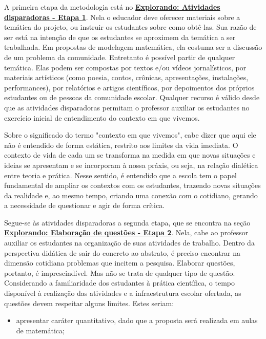 \begin{apresentacao}

A primeira etapa da metodologia está no \hyperref[etapa1]{\textcolor{session1}{\textbf{Explorando: Atividades disparadoras - Etapa 1}}}. Nela o educador deve oferecer materiais sobre a temática do projeto, ou instruir os estudantes sobre como obtê-las. Sua razão de ser está na intenção de que os estudantes se aproximem da temática a ser trabalhada. Em propostas de modelagem matemática, ela costuma ser a discussão de um problema da comunidade. Entretanto é possível partir de qualquer temática. Elas podem ser compostas por textos e/ou vídeos jornalísticos, por materiais artísticos (como poesia, contos, crônicas, apresentações, instalações, performances), por relatórios e artigos científicos, por depoimentos dos próprios estudantes ou de pessoas da comunidade escolar. Qualquer recurso é válido desde que as atividades disparadoras permitam o professor auxiliar os estudantes no exercício inicial de entendimento do contexto em que vivemos.

Sobre o significado do termo "contexto em que vivemos"{}, cabe dizer que aqui ele não é entendido de forma estática, restrito aos limites da vida imediata. O contexto de vida de cada um se transforma na medida em que novas situações e ideias se apresentam e se incorporam à nossa práxis, ou seja, na relação dialética entre teoria e prática. Nesse sentido, é entendido que a escola tem o papel fundamental de ampliar os contextos com os estudantes, trazendo novas situações da realidade e, ao mesmo tempo, criando uma conexão com o cotidiano, gerando a necessidade de questionar e agir de forma crítica.

Segue-se às atividades disparadoras a segunda etapa, que se encontra na seção \hyperref[etapa2]{\textcolor{session1}{\textbf{Explorando: Elaboração de questões - Etapa 2}}}. Nela, cabe ao professor auxiliar os estudantes na organização de suas atividades de trabalho. Dentro da perspectiva didática de sair do concreto ao abstrato, é preciso encontrar na dimensão cotidiana problemas que incitem a pesquisa. Elaborar questões, portanto, é imprescindível. Mas não se trata de qualquer tipo de questão. Considerando a familiaridade dos estudantes à prática científica, o tempo disponível à realização das atividades e a infraestrutura escolar ofertada, as questões devem respeitar alguns limites. Estes seriam:

\begin{itemize}
\item apresentar caráter quantitativo, dado que a proposta será realizada em aulas de matemática;


\end{itemize}
\end{apresentacao}
